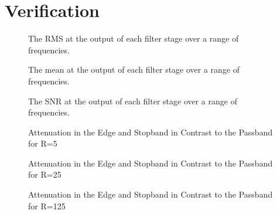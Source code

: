 \chapter{Verification}
\label{ch:verification}

\begin{figure}
    \centering
    
    \caption[The RMS at the output of each filter stage over a range of frequencies.]{%
        The RMS at the output of each filter stage over a range of frequencies.%
    }
    \label{fig:verification:rmsAll}
\end{figure}

\begin{figure}
    \centering
    
    \caption[The mean at the output of each filter stage over a range of frequencies.]{%
        The mean at the output of each filter stage over a range of frequencies.%
    }
    \label{fig:verification:rmsAll}
\end{figure}

\begin{figure}
    \centering
    
    \caption[The SNR at the output of each filter stage over a range of frequencies.]{%
        The SNR at the output of each filter stage over a range of frequencies.%
    }
    \label{fig:verification:rmsAll}
\end{figure}

\begin{figure}
    \centering
    
    \caption[Attenuation in the Edge and Stopband in Contrast to the Passband for R=5]{%
    Attenuation in the Edge and Stopband in Contrast to the Passband for R=5%
    }
    \label{fig:verification:fB5}
\end{figure}

\begin{figure}
    \centering
    
    \caption[Attenuation in the Edge and Stopband in Contrast to the Passband for R=25]{%
    Attenuation in the Edge and Stopband in Contrast to the Passband for R=25%
    }
    \label{fig:verification:fB5}
\end{figure}

\begin{figure}
    \centering
    
    \caption[Attenuation in the Edge and Stopband in Contrast to the Passband for R=125]{%
    Attenuation in the Edge and Stopband in Contrast to the Passband for R=125%
    }
    \label{fig:verification:fB5}
\end{figure}

